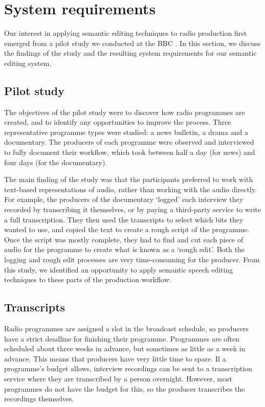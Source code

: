 

\section{System requirements}\label{sec:requirements}
Our interest in applying semantic editing techniques to radio production first
emerged from a pilot study we conducted at the BBC \citep{Baume2015}.  In this
section, we discuss the findings of the study and the resulting system
requirements for our semantic editing system.

\subsection{Pilot study}
The objectives of the pilot study were to discover how radio programmes are created, and to identify any opportunities
to improve the process.  Three representative programme types were studied: a news bulletin, a drama and a documentary.
The producers of each programme were observed and interviewed to fully document their workflow, which took between half
a day (for news) and four days (for the documentary).

The main finding of the study was that the participants preferred to work with text-based representations of audio,
rather than working with the audio directly. For example, the producers of the documentary `logged' each interview they
recorded by transcribing it themselves, or by paying a third-party service to write a full transcription.  They then
used the
transcripts to select which bits they wanted to use, and copied the text to
create a rough script of the programme. Once the script was mostly complete,
they had to find and cut each piece of audio for the programme to create what is known as a `rough edit'.  Both the
logging and rough edit processes are very time-consuming for the producer.  From this study, we identified an
opportunity to apply semantic speech editing techniques to these parts of the production workflow.

\subsection{Transcripts} Radio programmes are assigned a slot in the broadcast schedule, so producers
have a strict deadline for finishing their programme. Programmes are often
scheduled about three weeks in advance, but sometimes as little as a week in
advance. This means that producers have very little time to spare. If a
programme's budget allows, interview recordings can be sent to a transcription
service where they are transcribed by a person overnight. However,
most programmes do not have the budget for this, so the producer transcribes
the recordings themselves.

